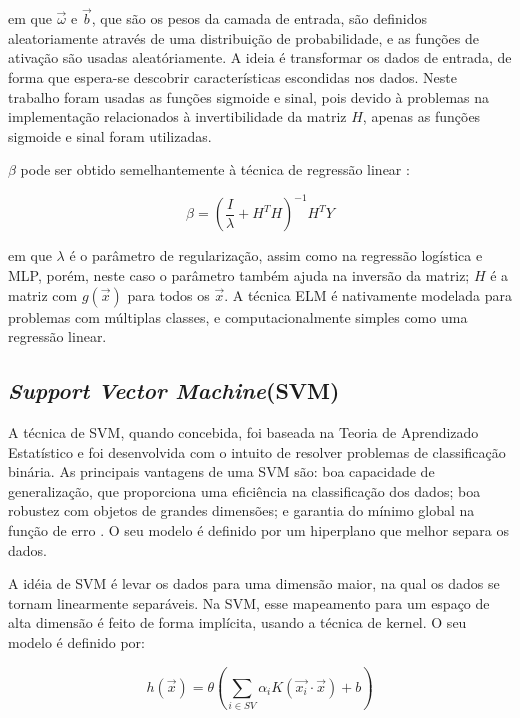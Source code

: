 \documentclass[12pt,a4paper,utf8]{ppgsi}
\begin{document}
em que $\vec{\omega}$ e $\vec{b}$, que são os pesos da camada de entrada, são definidos aleatoriamente através de uma distribuição de probabilidade, e as funções de ativação são usadas aleatóriamente. A ideia é transformar os dados de entrada, de forma que espera-se descobrir características escondidas nos dados. Neste trabalho foram usadas as funções sigmoide e sinal, pois devido à problemas na implementação relacionados à invertibilidade da matriz $H$, apenas as funções sigmoide e sinal foram utilizadas.

$\beta$ pode ser obtido semelhantemente à técnica de regressão linear \citep{elmmulticlass2012}:

\begin{dmath*} \label{eq:ff}
    \beta = \left( \frac{I}{\lambda} + H^{T}H \right)^{-1} H^T Y
\end{dmath*}

em que $\lambda$ é o parâmetro de regularização, assim como na regressão logística e MLP, porém, neste caso o parâmetro também ajuda na inversão da matriz; $H$ é a matriz com $g(\vec{x})$ para todos os $\vec{x}$. A técnica ELM é nativamente modelada para problemas com múltiplas classes, e computacionalmente simples como uma regressão linear.

\subsection{\textit{Support Vector Machine}(SVM)}

A técnica de SVM, quando concebida, foi baseada na Teoria de Aprendizado Estatístico e foi desenvolvida com o intuito de resolver problemas de classificação binária. As principais vantagens de uma SVM são: boa capacidade de generalização, que proporciona uma eficiência na classificação dos dados; boa robustez com objetos de grandes dimensões; e garantia do mínimo global na função de erro \citep{vapnik1999overview}. O seu modelo é definido por um hiperplano que melhor separa os dados.

A idéia de SVM é levar os dados para uma dimensão maior, na qual os dados se tornam linearmente separáveis. Na SVM, esse mapeamento para um espaço de alta dimensão é feito de forma implícita, usando a técnica de kernel. O seu modelo é definido por:

\begin{dmath*} \label{eq:ff}
    h(\vec{x}) = \theta\left( \sum_{i \in SV} \alpha_i K(\vec{x_i} \cdot \vec{x}) + b \right)
\end{dmath*}
\end{document}
